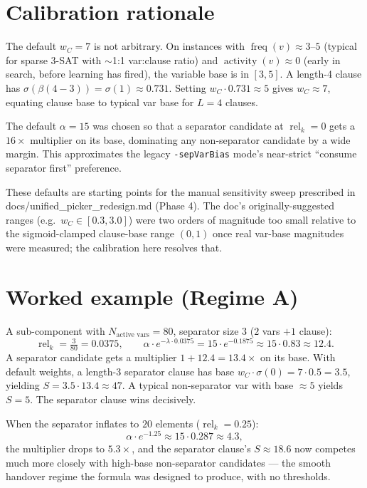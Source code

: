 \documentclass[11pt]{article}
\begin{document}
\section{Calibration rationale}\label{sec:cal}

The default $w_C = 7$ is not arbitrary. On instances with $\operatorname{freq}(v) \approx 3\text{--}5$
(typical for sparse 3-SAT with $\sim$1:1 var:clause ratio) and $\operatorname{activity}(v) \approx 0$
(early in search, before learning has fired), the variable base is in $[3, 5]$. A length-4 clause
has $\sigma(\beta(4 - 3)) = \sigma(1) \approx 0.731$. Setting $w_C \cdot 0.731 \approx 5$
gives $w_C \approx 7$, equating clause base to typical var base for $L = 4$ clauses.

The default $\alpha = 15$ was chosen so that a separator candidate at $\operatorname{rel}_k = 0$
gets a $16\times$ multiplier on its base, dominating any non-separator candidate by a wide
margin. This approximates the legacy \texttt{-sepVarBias} mode's near-strict ``consume
separator first'' preference.

These defaults are starting points for the manual sensitivity sweep prescribed in
docs/unified\_picker\_redesign.md (Phase 4). The doc's originally-suggested ranges
(e.g.\ $w_C \in [0.3, 3.0]$) were two orders of magnitude too small relative to the
sigmoid-clamped clause-base range $(0, 1)$ once real var-base magnitudes were measured;
the calibration here resolves that.

\section{Worked example (Regime A)}

A sub-component with $N_{\text{active vars}} = 80$, separator size $3$ ($2$ vars $+ 1$ clause):
\[
\operatorname{rel}_k = \tfrac{3}{80} = 0.0375, \qquad
\alpha \cdot e^{-\lambda \cdot 0.0375} = 15 \cdot e^{-0.1875} \approx 15 \cdot 0.83 \approx 12.4.
\]
A separator candidate gets a multiplier $1 + 12.4 = 13.4\times$ on its base. With
default weights, a length-3 separator clause has base $w_C \cdot \sigma(0) = 7 \cdot 0.5 = 3.5$,
yielding $S = 3.5 \cdot 13.4 \approx 47$. A typical non-separator var with base $\approx 5$
yields $S = 5$. The separator clause wins decisively.

When the separator inflates to $20$ elements ($\operatorname{rel}_k = 0.25$):
\[
\alpha \cdot e^{-1.25} \approx 15 \cdot 0.287 \approx 4.3,
\]
the multiplier drops to $5.3\times$, and the separator clause's $S \approx 18.6$ now competes
much more closely with high-base non-separator candidates --- the smooth handover regime the
formula was designed to produce, with no thresholds.
\end{document}
